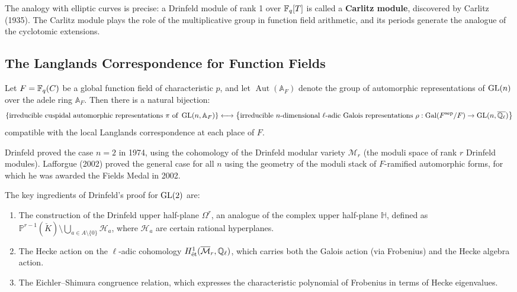 \begin{remark}
The analogy with elliptic curves is precise: a Drinfeld module of rank 1 over $\mathbb{F}_q[T]$ is called a \textbf{Carlitz module}, discovered by Carlitz (1935). The Carlitz module plays the role of the multiplicative group in function field arithmetic, and its periods generate the analogue of the cyclotomic extensions.
\end{remark}

\subsection{The Langlands Correspondence for Function Fields}

\begin{theorem}
Let $F = \mathbb{F}_q(C)$ be a global function field of characteristic $p$, and let $\operatorname{Aut}(\mathbb{A}_F)$ denote the group of automorphic representations of $\operatorname{GL}(n)$ over the adele ring $\mathbb{A}_F$. Then there is a natural bijection:
\[
\left\{ \text{irreducible cuspidal automorphic representations } \pi \text{ of } \operatorname{GL}(n, \mathbb{A}_F) \right\} \longleftrightarrow \left\{ \text{irreducible } n\text{-dimensional } \ell\text{-adic Galois representations } \rho: \operatorname{Gal}(F^{\mathrm{sep}}/F) \to \operatorname{GL}(n, \overline{\mathbb{Q}_\ell}) \right\}
\]
compatible with the local Langlands correspondence at each place of $F$.
\end{theorem}

\begin{remark}
Drinfeld proved the case $n = 2$ in 1974, using the cohomology of the Drinfeld modular variety $\mathcal{M}_r$ (the moduli space of rank $r$ Drinfeld modules). Lafforgue (2002) proved the general case for all $n$ using the geometry of the moduli stack of $F$-ramified automorphic forms, for which he was awarded the Fields Medal in 2002.
\end{remark}

The key ingredients of Drinfeld's proof for $\operatorname{GL}(2)$ are:
\begin{enumerate}
    \item The construction of the Drinfeld upper half-plane $\Omega^r$, an analogue of the complex upper half-plane $\mathbb{H}$, defined as $\mathbb{P}^{r-1}(\breve{K}) \setminus \bigcup_{a \in A \setminus \{0\}} \mathcal{H}_a$, where $\mathcal{H}_a$ are certain rational hyperplanes.
    \item The Hecke action on the $\ell$-adic cohomology $H^1_{\text{\'et}}(\overline{\mathcal{M}}_r, \mathbb{Q}_\ell)$, which carries both the Galois action (via Frobenius) and the Hecke algebra action.
    \item The Eichler--Shimura congruence relation, which expresses the characteristic polynomial of Frobenius in terms of Hecke eigenvalues.
\end{enumerate}

